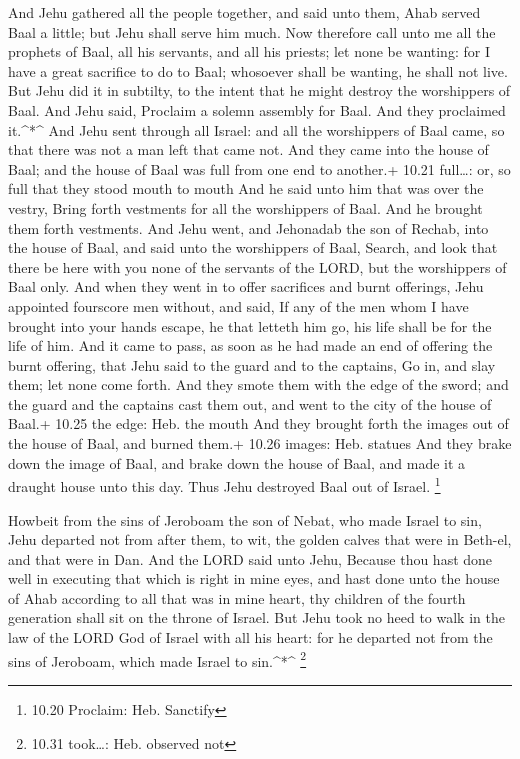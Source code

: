 And Jehu gathered all the people together, and said unto
them, Ahab served Baal a little; but Jehu shall serve him much.
 Now therefore call unto me all the prophets of Baal, all
his servants, and all his priests; let none be wanting: for I have a
great sacrifice to do to Baal; whosoever shall be wanting, he shall not
live. But Jehu did it in subtilty, to the intent that he might destroy
the worshippers of Baal.  And Jehu said, Proclaim a solemn
assembly for Baal. And they proclaimed it.\^{}*\^{}  And
Jehu sent through all Israel: and all the worshippers of Baal came, so
that there was not a man left that came not. And they came into the
house of Baal; and the house of Baal was full from one end to another.+
10.21 full\ldots: or, so full that they stood mouth to mouth
 And he said unto him that was over the vestry, Bring forth
vestments for all the worshippers of Baal. And he brought them forth
vestments.  And Jehu went, and Jehonadab the son of Rechab,
into the house of Baal, and said unto the worshippers of Baal, Search,
and look that there be here with you none of the servants of the LORD,
but the worshippers of Baal only.  And when they went in to
offer sacrifices and burnt offerings, Jehu appointed fourscore men
without, and said, If any of the men whom I have brought into your hands
escape, he that letteth him go, his life shall be for the life of him.
 And it came to pass, as soon as he had made an end of
offering the burnt offering, that Jehu said to the guard and to the
captains, Go in, and slay them; let none come forth. And they smote them
with the edge of the sword; and the guard and the captains cast them
out, and went to the city of the house of Baal.+ 10.25 the edge: Heb.
the mouth  And they brought forth the images out of the
house of Baal, and burned them.+ 10.26 images: Heb. statues
 And they brake down the image of Baal, and brake down the
house of Baal, and made it a draught house unto this day. 
Thus Jehu destroyed Baal out of Israel. \footnote{10.20 Proclaim: Heb.
  Sanctify}

 Howbeit from the sins of Jeroboam the son of Nebat, who
made Israel to sin, Jehu departed not from after them, to wit, the
golden calves that were in Beth-el, and that were in Dan. 
And the LORD said unto Jehu, Because thou hast done well in executing
that which is right in mine eyes, and hast done unto the house of Ahab
according to all that was in mine heart, thy children of the fourth
generation shall sit on the throne of Israel.  But Jehu
took no heed to walk in the law of the LORD God of Israel with all his
heart: for he departed not from the sins of Jeroboam, which made Israel
to sin.\^{}*\^{} \footnote{10.31 took\ldots: Heb. observed not}

